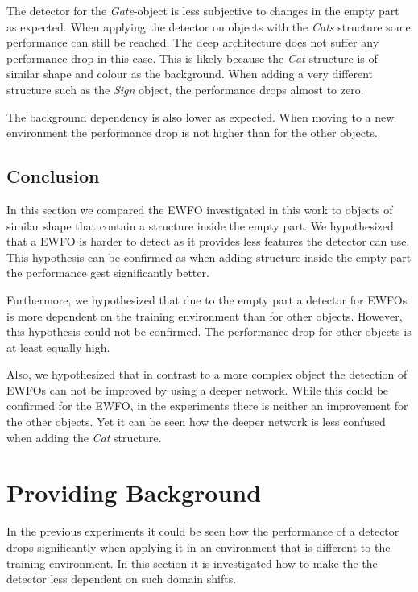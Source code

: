 The detector for the \textit{Gate}-object is less subjective to changes in the empty part as expected. When applying the detector on objects with the \textit{Cats} structure some performance can still be reached. The deep architecture does not suffer any performance drop in this case. This is likely because the \textit{Cat} structure is of similar shape and colour as the background. When adding a very different structure such as the \textit{Sign} object, the performance drops almost to zero.

The background dependency is also lower as expected. When moving to a new environment the performance drop is not higher than for the other objects.


\subsection{Conclusion}

In this section we compared the \ac{EWFO} investigated in this work to objects of similar shape that contain a structure inside the empty part. We hypothesized that a \ac{EWFO} is harder to detect as it provides less features the detector can use. This hypothesis can be confirmed as when adding structure inside the empty part the performance gest significantly better. 

Furthermore, we hypothesized that due to the empty part a detector for \acp{EWFO} is more dependent on the training environment than for other objects. However, this hypothesis could not be confirmed. The performance drop for other objects is at least equally high. 

Also, we hypothesized that in contrast to a more complex object the detection of \acp{EWFO} can not be improved by using a deeper network. While this could be confirmed for the \ac{EWFO}, in the experiments there is neither an improvement for the other objects. Yet it can be seen how the deeper network is less confused when adding the \textit{Cat} structure.

\section{Providing Background}

In the previous experiments it could be seen how the performance of a detector drops significantly when applying it in an environment that is different to the training environment. In this section it is investigated how to make the the detector less dependent on such domain shifts.

